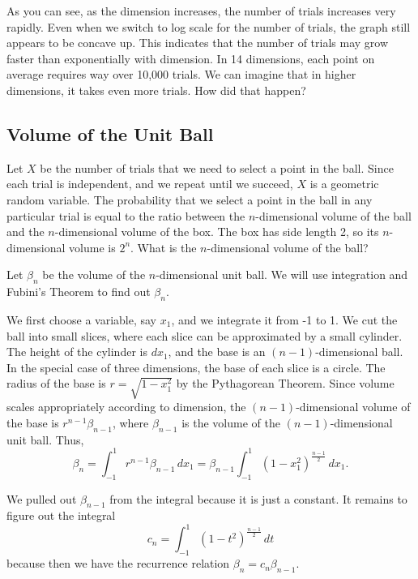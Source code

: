\documentclass{article}
\begin{document}
As you can see, as the dimension increases, the number of trials increases very rapidly. Even when we switch to log scale for the number of trials, the graph still appears to be concave up. This indicates that the number of trials may grow faster than exponentially with dimension. In 14 dimensions, each point on average requires way over 10,000 trials. We can imagine that in higher dimensions, it takes even more trials. How did that happen?

\subsection{Volume of the Unit Ball}

Let $X$ be the number of trials that we need to select a point in the ball. Since each trial is independent, and we repeat until we succeed, $X$ is a geometric random variable. The probability that we select a point in the ball in any particular trial is equal to the ratio between the $n$-dimensional volume of the ball and the $n$-dimensional volume of the box. The box has side length 2, so its $n$-dimensional volume is $2^n$. What is the $n$-dimensional volume of the ball?


Let $\beta_n$ be the volume of the $n$-dimensional unit ball. We will use integration and Fubini's Theorem to find out $\beta_n$.

We first choose a variable, say $x_1$, and we integrate it from -1 to 1. We cut the ball into small slices, where each slice can be approximated by a small cylinder. The height of the cylinder is $dx_1$, and the base is an $(n-1)$-dimensional ball. In the special case of three dimensions, the base of each slice is a circle. The radius of the base is $r = \sqrt{1 - x_1^2}$ by the Pythagorean Theorem. Since volume scales appropriately according to dimension, the $(n-1)$-dimensional volume of the base is $r^{n-1} \beta_{n-1}$, where $\beta_{n-1}$ is the volume of the $(n-1)$-dimensional unit ball. Thus,
\[
  \beta_n = \int_{-1}^1 r^{n-1} \beta_{n-1} \, dx_1 = \beta_{n-1} \int_{-1}^1 (1 - x_1^2)^{\frac{n-1}{2}} \, dx_1.
\]

We pulled out $\beta_{n-1}$ from the integral because it is just a constant. It remains to figure out the integral
\[
  c_n = \int_{-1}^1 (1 - t^2)^{\frac{n-1}{2}} \, dt
\]
because then we have the recurrence relation $\beta_n = c_n \beta_{n - 1}$.
\end{document}

